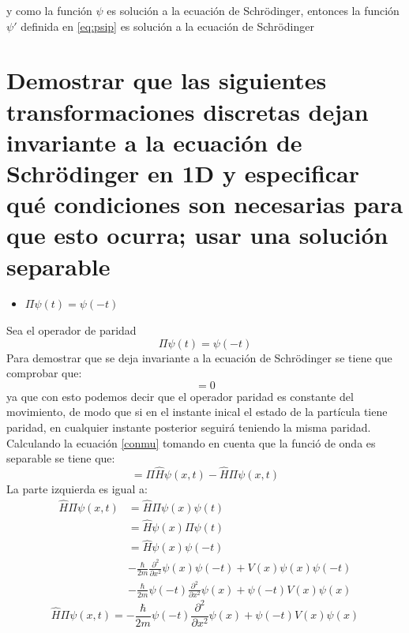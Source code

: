 \documentclass[12pt,letterpaper]{article}
\begin{document}
y como la función $\psi$ es solución a la ecuación de Schr\"odinger, entonces la función ${\psi}'$ definida en \ref{eq:psip} es solución a la ecuación de Schr\"odinger
\pagebreak
\section*{Demostrar que las siguientes transformaciones discretas dejan invariante a la ecuación de
Schrödinger en 1D y especificar qué condiciones son necesarias para que esto ocurra; usar una
solución separable}
\begin{itemize}
    \item $\Pi \psi(t) = \psi(-t)$
\end{itemize}
Sea el operador de paridad
\begin{equation}
    \Pi\psi(t) = \psi(-t)
    \label{parity}
\end{equation}
Para demostrar que se deja invariante a la ecuación de Schr\"odinger se tiene que comprobar que:
\begin{equation}
    [\Pi,\hat{H}]=0
    \label{conmu}
\end{equation}
ya que con esto podemos decir que el operador paridad es constante del movimiento, de modo que si en el instante inical el estado de la partícula tiene paridad, en cualquier instante posterior seguirá teniendo la misma paridad.\\
Calculando la ecuación \ref{conmu} tomando en cuenta que la funció de onda es separable se tiene que:
\begin{equation*}
[\Pi,\hat{H}]= \Pi\hat{H} \psi(x,t) - \hat{H}\Pi \psi(x,t)
\end{equation*}
La parte izquierda es igual a:
\begin{align*}
\hat{H}\Pi \psi(x,t)    &= \hat{H}\Pi\psi(x)\psi(t)\\
                        &= \hat{H}\psi(x)\Pi\psi(t)\\
                        &= \hat{H}\psi(x)\psi(-t)\\
                        &-\frac{\hbar}{2m}\frac{\partial^2}{\partial x^2} \psi(x)\psi(-t) +V(x)\psi(x)\psi(-t)\\
                        &-\frac{\hbar}{2m}\psi(-t)\frac{\partial^2}{\partial x^2} \psi(x) +\psi(-t)V(x)\psi(x)
\end{align*}
\begin{equation}
\hat{H}\Pi \psi(x,t)= -\frac{\hbar}{2m}\psi(-t)\frac{\partial^2}{\partial x^2} \psi(x) +\psi(-t)V(x)\psi(x)
\label{izq}
\end{equation}
\end{document}
